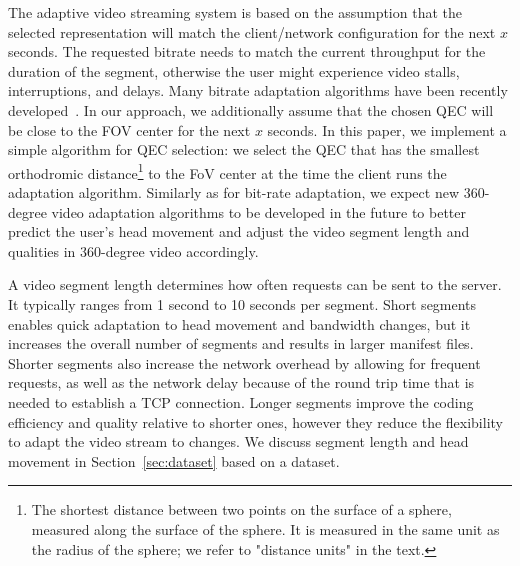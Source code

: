 The adaptive video streaming system is based on the assumption that
the selected representation will match the client/network
configuration for the next $x$ seconds. The requested bitrate needs to
match the current throughput for the duration of the segment,
otherwise the user might experience video stalls, interruptions, and
delays. Many bitrate adaptation algorithms have been recently
developed~\cite{tian,probe_li_2014,miller,zou,liu}. In our approach,
we additionally assume that the chosen QEC will be close to the FOV
center for the next $x$ seconds. In this paper, we implement a simple
algorithm for QEC selection: we select the QEC that has the smallest
orthodromic distance\footnote{The shortest distance between two points
on the surface of a sphere, measured along the surface of the sphere. It is measured in the same unit as the radius of the sphere; we refer to "distance units" in the text.}
to the FoV center at the time the client runs the adaptation
algorithm.
Similarly as for bit-rate adaptation, we expect new 360-degree video
adaptation algorithms to be developed in the future to better predict
the user's head movement and adjust the video segment length and
qualities in 360-degree video accordingly.


 A video segment length determines how
often requests can be sent to the server. It typically ranges from 1
second to 10 seconds per segment. Short segments enables quick
adaptation to head movement and bandwidth changes, but it increases
the overall number of segments and results in larger manifest files.
Shorter segments also increase the network overhead by allowing for
frequent requests, as well as the network delay because of the round
trip time that is needed to establish a TCP connection.
Longer segments improve the coding efficiency and quality relative to
shorter ones, however they reduce the flexibility to adapt the video
stream to changes. We discuss segment length and head movement in
Section~\ref{sec:dataset} based on a dataset.

